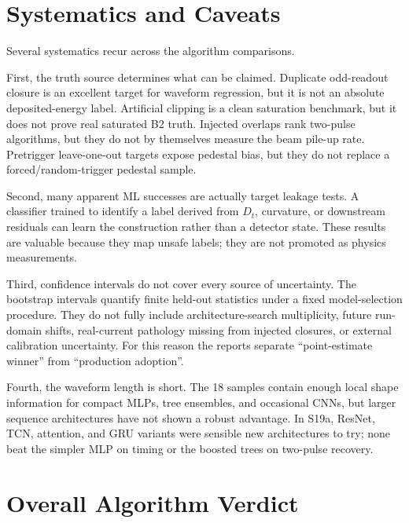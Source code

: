 \section{Systematics and Caveats}

Several systematics recur across the algorithm comparisons.

First, the truth source determines what can be claimed. Duplicate odd-readout closure is an excellent target for waveform regression, but it is not an absolute deposited-energy label. Artificial clipping is a clean saturation benchmark, but it does not prove real saturated B2 truth. Injected overlaps rank two-pulse algorithms, but they do not by themselves measure the beam pile-up rate. Pretrigger leave-one-out targets expose pedestal bias, but they do not replace a forced/random-trigger pedestal sample.

Second, many apparent ML successes are actually target leakage tests. A classifier trained to identify a label derived from \(D_t\), curvature, or downstream residuals can learn the construction rather than a detector state. These results are valuable because they map unsafe labels; they are not promoted as physics measurements.

Third, confidence intervals do not cover every source of uncertainty. The bootstrap intervals quantify finite held-out statistics under a fixed model-selection procedure. They do not fully include architecture-search multiplicity, future run-domain shifts, real-current pathology missing from injected closures, or external calibration uncertainty. For this reason the reports separate ``point-estimate winner'' from ``production adoption''.

Fourth, the waveform length is short. The 18 samples contain enough local shape information for compact MLPs, tree ensembles, and occasional CNNs, but larger sequence architectures have not shown a robust advantage. In S19a, ResNet, TCN, attention, and GRU variants were sensible new architectures to try; none beat the simpler MLP on timing or the boosted trees on two-pulse recovery.

\section{Overall Algorithm Verdict}


